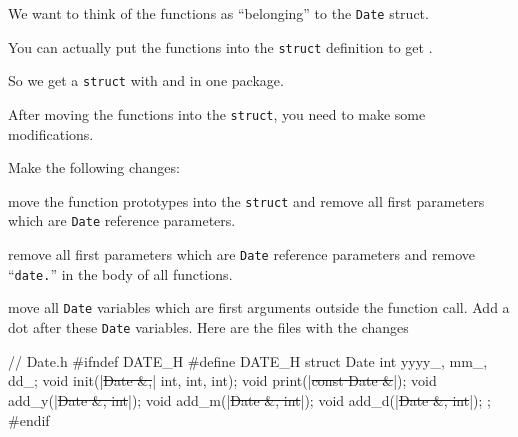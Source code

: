 We want to think of the functions as ``belonging'' to the \texttt{Date}
struct.

You can actually put the functions into the \texttt{struct} definition to
get  .

So we get a \texttt{struct} with  and
 in one package.

After moving the functions into the \texttt{struct}, you need to make some
modifications.



\newpage{}

Make the following changes:

\texttt{}\EMPHASIZE{:} move the function
prototypes into the \texttt{struct} and remove all first parameters which
are \texttt{Date} reference parameters.

\texttt{}\EMPHASIZE{:} remove all first
parameters which are \texttt{Date} reference parameters and remove
``\texttt{date.}'' in the body of all functions.

\texttt{}\EMPHASIZE{:} move all \texttt{Date}
variables which are first arguments outside the function call. Add a dot
after these \texttt{Date} variables.
Here are the files with the changes

\begin{consolethree}[escapeinside=||]
// Date.h
#ifndef DATE_H
#define DATE_H
struct Date
{
    int yyyy_, mm_, dd_;
    void init(|\sout{Date \&,}| int, int, int);
    void print(|\sout{const Date \&}|);
    void add_y(|\sout{Date \&, int}|);
    void add_m(|\sout{Date \&, int}|);
    void add_d(|\sout{Date \&, int}|);
};
#endif
\end{consolethree}

